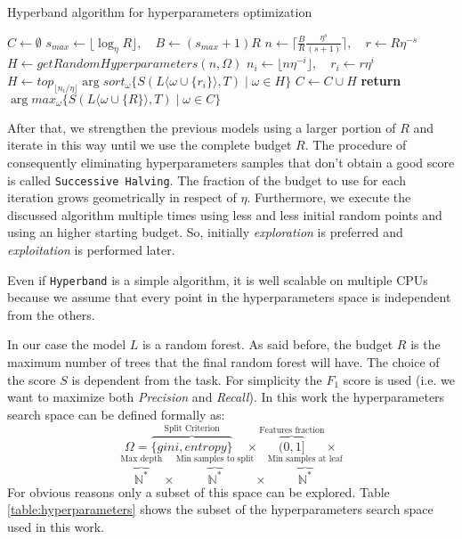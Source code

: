 \documentclass[11pt, a4paper]{article}
\begin{document}
  \begin{algorithm}
    \caption{Hyperband algorithm for hyperparameters optimization}
    \label{algorithm:hyperband}
    \begin{algorithmic}[1]
        \State $C \gets \emptyset$
        \State $s_{max} \gets \lfloor \log_{\eta}{R} \rfloor, \quad B \gets (s_{max} + 1)R$
          \State $n \gets \lceil \frac{B}{R}\frac{\eta^{s}}{(s+1)} \rceil, \quad r \gets R\eta^{-s}$
          \State $H \gets getRandomHyperparameters(n,\Omega)$
            \State $n_{i} \gets \lfloor n\eta^{-i} \rfloor, \quad r_{i} \gets r\eta^{i}$
            \State $H \gets top_{\lfloor n_{i}/\eta \rfloor} \arg sort_{\omega} \{S(L\langle\omega \cup \{r_{i}\}\rangle, T) \mid \omega \in H\}$
          \EndFor
          \State $C \gets C \cup H$
        \EndFor
        \State \textbf{return} $\arg max_{\omega} \{S(L\langle\omega \cup \{R\}\rangle, T) \mid \omega \in C\}$
      \EndProcedure
    \end{algorithmic}
  \end{algorithm}

  After that, we strengthen the previous models using a larger portion of $R$ and iterate in this way until we use the complete budget $R$.
  The procedure of consequently eliminating hyperparameters samples that don't obtain a good score is called \texttt{Successive Halving}.
  The fraction of the budget to use for each iteration grows geometrically in respect of $\eta$.
  Furthermore, we execute the discussed algorithm multiple times using less and less initial random points and using an higher starting budget.
  So, initially \textit{exploration} is preferred and \textit{exploitation} is performed later.

  Even if \texttt{Hyperband} is a simple algorithm, it is well scalable on multiple CPUs because we assume that every point in the hyperparameters space is independent from the others.

  In our case the model $L$ is a random forest.
  As said before, the budget $R$ is the maximum number of trees that the final random forest will have.
  The choice of the score $S$ is dependent from the task.
  For simplicity the $F_{1}$ score is used (i.e. we want to maximize both \textit{Precision} and \textit{Recall}).
  In this work the hyperparameters search space can be defined formally as:
  \[\Omega = \overbrace{\{gini, entropy\}}^{\text{Split Criterion}} \quad\times \overbrace{(0, 1]}^{\text{Features fraction}} \times\]
  \[\overbrace{\mathbb{N}^{*}}^{\text{Max depth}} \times \overbrace{\mathbb{N}^{*}}^{\text{Min samples to split}} \times \overbrace{\mathbb{N}^{*}}^{\text{Min samples at leaf}}\]
  For obvious reasons only a subset of this space can be explored.
  Table \ref{table:hyperparameters} shows the subset of the hyperparameters search space used in this work.
\end{document}
